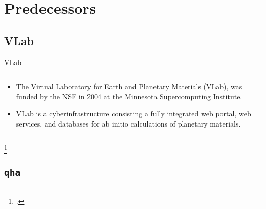 \section{Predecessors}

\subsection{VLab}

\begin{frame}{VLab}
    \begin{columns}[t]
        \begin{column}[T, onlytextwidth]{0.4\textwidth} %
            \begin{itemize}
                \item The Virtual Laboratory for Earth and Planetary Materials
                      (VLab)\footnotemark, was
                      funded by the NSF in 2004 at the Minnesota Supercomputing Institute.
                \item VLab is a cyberinfrastructure consisting a fully integrated web
                      portal, web services, and databases for ab initio calculations of
                      planetary materials.
            \end{itemize}
        \end{column}

        \begin{column}[T]{0.6\textwidth}
        \end{column}
    \end{columns}
    \footcitetext{DASILVA2007321}

\end{frame}

\subsection{\texttt{qha}}


